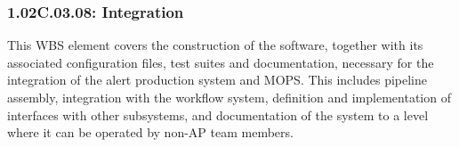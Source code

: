 \subsubsection*{1.02C.03.08: Integration}

This WBS element covers the construction of the software, together with
its associated configuration files, test suites and documentation, necessary
for the integration of the alert production system and MOPS.  This includes
pipeline assembly, integration with the workflow system, definition and
implementation of interfaces with other subsystems, and documentation
of the system to a level where it can be operated by non-AP team members.
